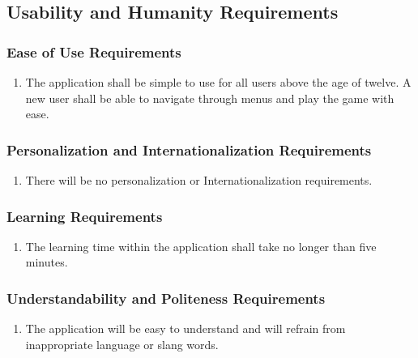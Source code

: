 \documentclass[12pt, titlepage]{article}
\begin{document}

\subsection{Usability and Humanity Requirements}
\label{sub:usability_and_humanity_requirements}

\subsubsection{Ease of Use Requirements}
\label{ssub:ease_of_use_requirements}
\begin{enumerate}[{UH}1. ]
	\item The application shall be simple to use for all users above the age of twelve. A new user shall be able to navigate through menus and play the game with ease.
\end{enumerate}

\subsubsection{Personalization and Internationalization Requirements}
\label{ssub:personalization_and_internationalization_requirements}
\begin{enumerate}[{UH}1. ]
	\item There will be no personalization or Internationalization requirements.
\end{enumerate}

\subsubsection{Learning Requirements}
\label{ssub:learning_requirements}
\begin{enumerate}[{UH}1. ]
	\item The learning time within the application shall take no longer than five minutes.
\end{enumerate}

\subsubsection{Understandability and Politeness Requirements}
\label{ssub:understandability_and_politeness_requirements}
\begin{enumerate}[{UH}1. ]
	\item The application will be easy to understand and will refrain from inappropriate language or slang words.
\end{enumerate}
\end{document}
